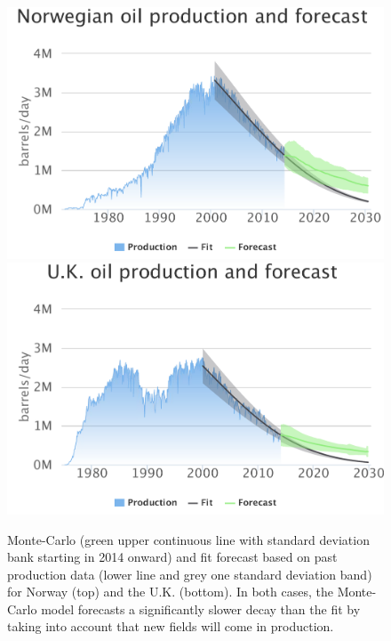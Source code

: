 \documentclass[review]{elsarticle}
\begin{document}
\begin{figure}[H]
\includegraphics[width=1\columnwidth]{NO-future}
\includegraphics[width=1\columnwidth]{UK-future} 
\caption{Monte-Carlo (green upper
continuous line with standard deviation bank starting in 2014 onward)
and fit forecast based on past production data (lower line and grey one standard deviation band) for Norway
(top) and the U.K. (bottom). In both cases, the Monte-Carlo model forecasts
a significantly slower decay than the fit by taking into account that
new fields will come in production.}
\label{no_uk_2013} 
\end{figure}
\end{document}
